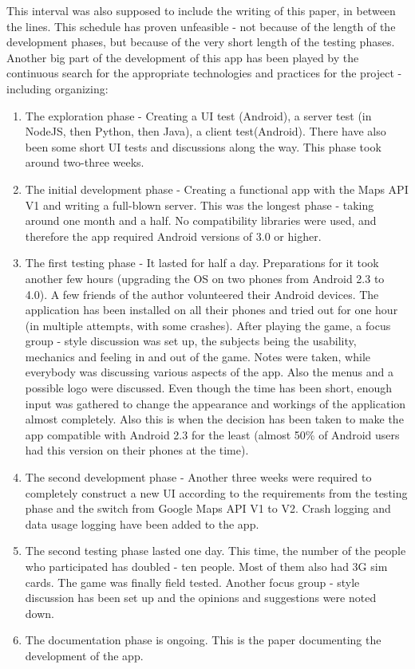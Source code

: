 \documentclass{article}
\begin{document}
This interval was also supposed to include the writing of this paper, in between
the lines. This schedule has proven unfeasible - not because of the length of
the development phases, but because of the very short length of the testing
phases. Another big part of the development of this app has been played by the
continuous search for the appropriate technologies and practices for the project
- including organizing:
\begin{enumerate}
  \item The exploration phase - Creating a UI test (Android), a server test
  (in NodeJS, then Python, then Java), a client test(Android). There have also
  been some short UI tests and discussions along the way. This phase took around
  two-three weeks.
  
  \item The initial development phase - Creating a functional app with the Maps
  API V1 and writing a full-blown server. This was the longest phase - taking
  around one month and a half. No compatibility libraries were used, and
  therefore the app required Android versions of 3.0 or higher.
  
  \item The first testing phase - It lasted for half a day. Preparations for it
  took another few hours (upgrading the OS on two phones from Android 2.3 to
  4.0). A few friends of the author volunteered their Android devices.
  The application has been installed on all their phones and tried out for one
  hour (in multiple attempts, with some crashes). After playing the game, a
  focus group - style discussion was set up, the subjects being the usability,
  mechanics and feeling in and out of the game. Notes were taken, while
  everybody was discussing various aspects of the app. Also the menus and a
  possible logo were discussed. Even though the time has been short, enough
  input was gathered to change the appearance and workings of the application
  almost completely. Also this is when the decision has been taken to make the
  app compatible with Android 2.3 for the least (almost 50\% of Android users
  had this version on their phones at the time).
  
  \item The second development phase - Another three weeks were required to
  completely construct a new UI according to the requirements from the testing
  phase and the switch from Google Maps API V1 to V2. Crash logging and data
  usage logging have been added to the app.
  
  \item The second testing phase lasted one day. This time, the number of the
  people who participated has doubled - ten people. Most of them also had 3G sim
  cards. The game was finally field tested. Another focus group - style
  discussion has been set up and the opinions and suggestions were noted down.
  
  \item The documentation phase is ongoing. This is the paper documenting the
  development of the app.
  
\end{enumerate}
\end{document}

